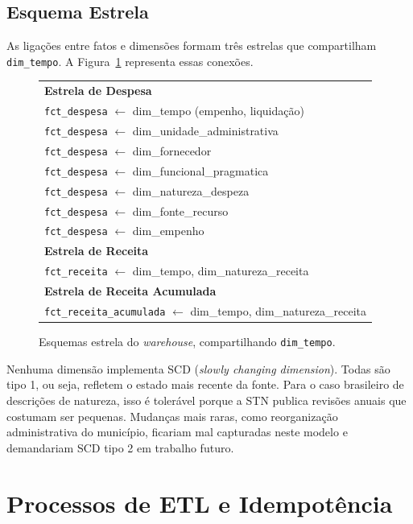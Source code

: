 \subsection{Esquema Estrela}

As ligações entre fatos e dimensões formam três estrelas que compartilham \texttt{dim\_tempo}. A Figura~\ref{fig:estrelas} representa essas conexões.

\begin{figure}[ht]
\begin{center}
\begin{tabular}{|l|}
\hline
\textbf{Estrela de Despesa} \\
\texttt{fct\_despesa} $\leftarrow$ dim\_tempo (empenho, liquidação) \\
\texttt{fct\_despesa} $\leftarrow$ dim\_unidade\_administrativa \\
\texttt{fct\_despesa} $\leftarrow$ dim\_fornecedor \\
\texttt{fct\_despesa} $\leftarrow$ dim\_funcional\_pragmatica \\
\texttt{fct\_despesa} $\leftarrow$ dim\_natureza\_despeza \\
\texttt{fct\_despesa} $\leftarrow$ dim\_fonte\_recurso \\
\texttt{fct\_despesa} $\leftarrow$ dim\_empenho \\
\hline
\textbf{Estrela de Receita} \\
\texttt{fct\_receita} $\leftarrow$ dim\_tempo, dim\_natureza\_receita \\
\hline
\textbf{Estrela de Receita Acumulada} \\
\texttt{fct\_receita\_acumulada} $\leftarrow$ dim\_tempo, dim\_natureza\_receita \\
\hline
\end{tabular}
\caption{Esquemas estrela do \textit{warehouse}, compartilhando \texttt{dim\_tempo}.}
\label{fig:estrelas}
\end{center}
\end{figure}

Nenhuma dimensão implementa SCD (\textit{slowly changing dimension}). Todas são tipo 1, ou seja, refletem o estado mais recente da fonte. Para o caso brasileiro de descrições de natureza, isso é tolerável porque a STN publica revisões anuais que costumam ser pequenas. Mudanças mais raras, como reorganização administrativa do município, ficariam mal capturadas neste modelo e demandariam SCD tipo 2 em trabalho futuro.

\section{Processos de ETL e Idempotência}


